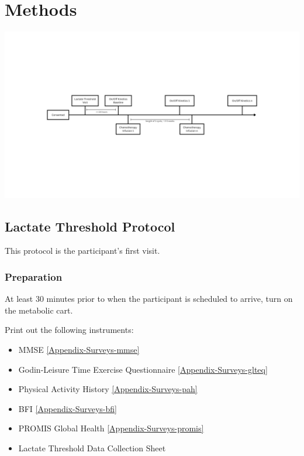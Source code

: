 \documentclass[
]{book}
\providecommand{\tightlist}{%
  \setlength{\itemsep}{0pt}\setlength{\parskip}{0pt}}
\begin{document}
\hypertarget{Methods}{%
\chapter{Methods}\label{Methods}}

\includegraphics[width=26.67in]{images/visit_timeline}

\hypertarget{Methods-LT}{%
\section{Lactate Threshold Protocol}\label{Methods-LT}}

This protocol is the participant's first visit.

\hypertarget{Methods-LT-prep}{%
\subsection{Preparation}\label{Methods-LT-prep}}

At least 30 minutes prior to when the participant is scheduled to arrive, turn on the metabolic cart.

Print out the following instruments:

\begin{itemize}
\tightlist
\item
  MMSE \ref{Appendix-Surveys-mmse}
\item
  Godin-Leisure Time Exercise Questionnaire \ref{Appendix-Surveys-glteq}
\item
  Physical Activity History \ref{Appendix-Surveys-pah}
\item
  BFI \ref{Appendix-Surveys-bfi}
\item
  PROMIS Global Health \ref{Appendix-Surveys-promis}
\item
  Lactate Threshold Data Collection Sheet
\end{itemize}
\end{document}
